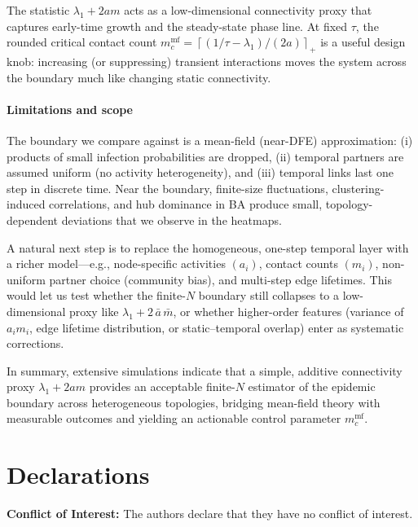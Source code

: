 \documentclass[pdflatex,sn-mathphys-num]{sn-jnl}%
\theoremstyle{thmstyleone}%
\theoremstyle{thmstyletwo}%
\theoremstyle{thmstylethree}%
\begin{document}
The statistic \(\lambda_1+2am\) acts as a low-dimensional connectivity proxy that
captures early-time growth and the steady-state phase line. At fixed \(\tau\), the rounded critical contact
count \(m_c^{\text{mf}}=\left\lceil (1/\tau-\lambda_1)/(2a) \right\rceil_+\) is a useful
design knob: increasing (or suppressing) transient interactions moves the system across
the boundary much like changing static connectivity.

\paragraph*{Limitations and scope}
The boundary we compare against is a mean-field (near-DFE) approximation:
(i) products of small infection probabilities are dropped, (ii) temporal partners are
assumed uniform (no activity heterogeneity), and (iii) temporal links last one step in
discrete time. Near the boundary, finite-size fluctuations, clustering-induced
correlations, and hub dominance in BA produce small, topology-dependent deviations
that we observe in the heatmaps.

A natural next step is to replace the homogeneous, one-step temporal layer with a richer model—e.g., node-specific activities \((a_i)\), contact counts \((m_i)\), non-uniform partner choice (community bias), and multi-step edge lifetimes. This would let us test whether the finite-\(N\) boundary still collapses to a low-dimensional proxy like \(\lambda_1 + 2\,\bar a\,\bar m\), or whether higher-order features (variance of \(a_i m_i\), edge lifetime distribution, or static–temporal overlap) enter as systematic corrections.


\smallskip
In summary, extensive simulations indicate that a simple, additive connectivity proxy
\(\lambda_1+2am\) provides an acceptable finite-\(N\) estimator of the epidemic
boundary across heterogeneous topologies, bridging mean-field theory with measurable
outcomes and yielding an actionable control parameter \(m_c^{\text{mf}}\).


\section*{Declarations}
\textbf{Conflict of Interest:} The authors declare that they have no conflict of interest.
\end{document}
